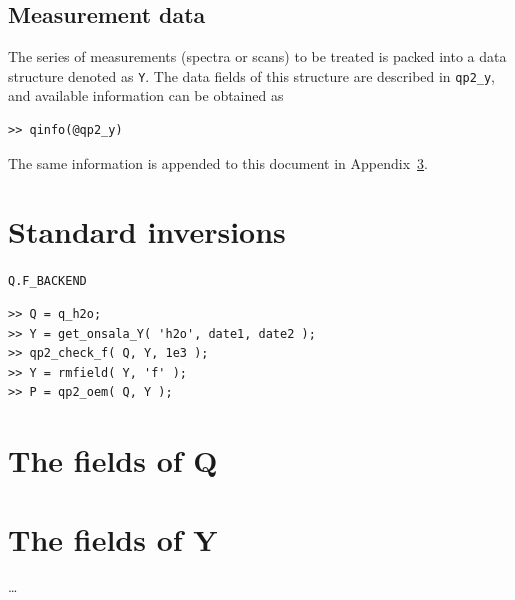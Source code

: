 \documentclass[a4paper,11pt]{article}
\begin{document}
\subsection{Measurement data}
\label{sec:Y}
The series of measurements (spectra or scans) to be treated is packed
into a data structure denoted as \verb|Y|. The data fields of this
structure are described in \verb|qp2_y|, and available information can be
obtained as
\begin{verbatim}
>> qinfo(@qp2_y)
\end{verbatim}
The same information is appended to this document in
Appendix~\ref{app:y}.



\section{Standard inversions}
\label{sec:stdinversions}




\verb|Q.F_BACKEND|

\begin{verbatim}
>> Q = q_h2o;
>> Y = get_onsala_Y( 'h2o', date1, date2 );
>> qp2_check_f( Q, Y, 1e3 );
>> Y = rmfield( Y, 'f' );
>> P = qp2_oem( Q, Y );
\end{verbatim}



\appendix

\newpage{}

\section{The fields of Q}
\label{app:q}
%



\newpage
\section{The fields of Y}
\label{app:y}
%
\dots
\end{document}
